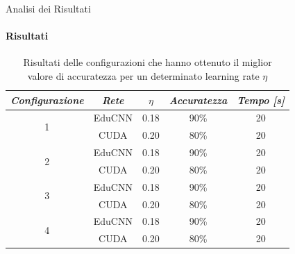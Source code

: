 \documentclass[
 ]{beamer}
\begin{document}
\begin{frame}{Analisi dei Risultati}
    \framesubtitle{Risultati}
    \bigskip
    \bigskip
        \begin{table}
            \centering
            \renewcommand\arraystretch{1.2} 
            \begin{tabular}{| c | c | c | c | c |}
                \hline
                \emph{Configurazione} & \emph{Rete} & $\eta$ & \emph{Accuratezza} & \emph{Tempo [s]} \\
                \hline
                \multirow{2}{*}{1} & EduCNN & 0.18 & 90\% & 20 \\ \cline{2-5} 
                                   & CUDA   & 0.20 & 80\% & 20 \\                
                \hline
                \multirow{2}{*}{2} & EduCNN & 0.18 & 90\% & 20 \\ \cline{2-5} 
                                   & CUDA   & 0.20 & 80\% & 20 \\
                \hline
                \multirow{2}{*}{3} & EduCNN & 0.18 & 90\% & 20 \\ \cline{2-5} 
                                   & CUDA   & 0.20 & 80\% & 20 \\
                \hline
                \multirow{2}{*}{4} & EduCNN & 0.18 & 90\% & 20 \\ \cline{2-5} 
                                   & CUDA   & 0.20 & 80\% & 20 \\
                \hline
            \end{tabular}
            \caption
    {Risultati delle configurazioni che hanno ottenuto il miglior \\ valore di accuratezza per un determinato learning rate $\eta$\endtabular}          
        \end{table}    
\end{frame}
\end{document}
